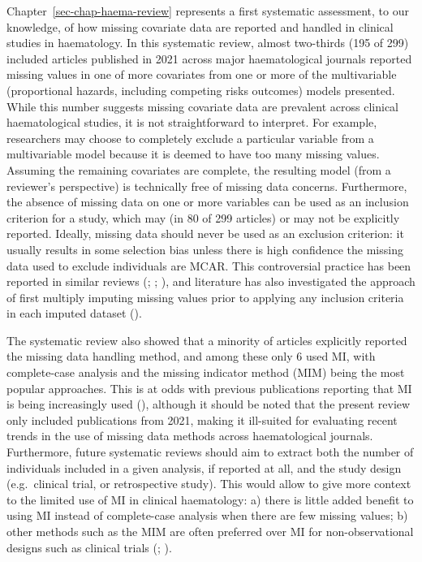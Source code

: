 \documentclass[
  letterpaper,
  paper=240mm:170mm,
  twoside=true,
  open=right,
  fontsize=10pt,
  pagesize=false,
  BCOR=15mm,
  DIV=14,
  headinclude=true,
  footinclude=false,
  headsepline=on]{scrbook}
\begin{document}
Chapter~\ref{sec-chap-haema-review} represents a first systematic
assessment, to our knowledge, of how missing covariate data are reported
and handled in clinical studies in haematology. In this systematic
review, almost two-thirds (195 of 299) included articles published in
2021 across major haematological journals reported missing values in one
of more covariates from one or more of the multivariable (proportional
hazards, including competing risks outcomes) models presented. While
this number suggests missing covariate data are prevalent across
clinical haematological studies, it is not straightforward to interpret.
For example, researchers may choose to completely exclude a particular
variable from a multivariable model because it is deemed to have too
many missing values. Assuming the remaining covariates are complete, the
resulting model (from a reviewer's perspective) is technically free of
missing data concerns. Furthermore, the absence of missing data on one
or more variables can be used as an inclusion criterion for a study,
which may (in 80 of 299 articles) or may not be explicitly reported.
Ideally, missing data should never be used as an exclusion criterion: it
usually results in some selection bias unless there is high confidence
the missing data used to exclude individuals are MCAR. This
controversial practice has been reported in similar reviews
(; ; ), and literature has also investigated the approach of first
multiply imputing missing values prior to applying any inclusion
criteria in each imputed dataset
().

The systematic review also showed that a minority of articles explicitly
reported the missing data handling method, and among these only 6 used
MI, with complete-case analysis and the missing indicator method (MIM)
being the most popular approaches. This is at odds with previous
publications reporting that MI is being increasingly used
(), although it should be noted that the present
review only included publications from 2021, making it ill-suited for
evaluating recent trends in the use of missing data methods across
haematological journals. Furthermore, future systematic reviews should
aim to extract both the number of individuals included in a given
analysis, if reported at all, and the study design (e.g.~clinical trial,
or retrospective study). This would allow to give more context to the
limited use of MI in clinical haematology: a) there is little added
benefit to using MI instead of complete-case analysis when there are few
missing values; b) other methods such as the MIM are often preferred
over MI for non-observational designs such as clinical trials
(; ).
\end{document}
